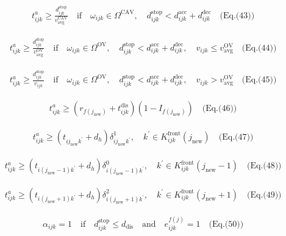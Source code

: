\documentclass[10pt]{article}
\begin{document}
\[\begin{aligned}&\quad t^{a}_{ijk} \geq \frac{d^{\text{stop}}_{ijk}}{v^{\text{CAV}}_{\text{avg}}} \quad \text{if} \quad \omega_{ijk} \in \Omega^{\text{CAV}}, \quad d^{\text{stop}}_{ijk} < d^{\text{acc}}_{ijk} + d^{\text{dec}}_{ijk} \quad \text{(Eq.(43))}\end{aligned}\]

\[\begin{aligned}&\quad t^{a}_{ijk} \geq \frac{d^{\text{stop}}_{ijk}}{v^{\text{OV}}_{\text{avg}}} \quad \text{if} \quad \omega_{ijk} \in \Omega^{\text{OV}}, \quad d^{\text{stop}}_{ijk} < d^{\text{acc}}_{ijk} + d^{\text{dec}}_{ijk}, \quad v_{ijk} \leq v^{\text{OV}}_{\text{avg}} \quad \text{(Eq.(44))}\end{aligned}\]

\[\begin{aligned}&\quad t^{a}_{ijk} \geq \frac{d^{\text{stop}}_{ijk}}{v_{ijk}} \quad \text{if} \quad \omega_{ijk} \in \Omega^{\text{OV}}, \quad d^{\text{stop}}_{ijk} < d^{\text{acc}}_{ijk} + d^{\text{dec}}_{ijk}, \quad v_{ijk} > v^{\text{OV}}_{\text{avg}} \quad \text{(Eq.(45))}\end{aligned}\]

\[\begin{aligned}&\quad t^{a}_{ijk} \geq (r_{f(j_{\text{new}})} + t^{\text{dis}}_{ijk})(1 - I_{f(j_{\text{new}})}) \quad \text{(Eq.(46))}\end{aligned}\]

\[\begin{aligned}&\quad t^{a}_{ijk} \geq (t_{ij_{\text{new}}k^{\prime}} + d_{h})\delta^{1}_{ij_{\text{new}}k^{\prime}}, \quad k^{\prime} \in K^{\text{front}}_{ijk}(j_{\text{new}}) \quad \text{(Eq.(47))}\end{aligned}\]

\[\begin{aligned}&\quad t^{a}_{ijk} \geq (t_{i(j_{\text{new}}-1)k^{\prime}} + d_{h})\delta^{0}_{i(j_{\text{new}}-1)k^{\prime}}, \quad k^{\prime} \in K^{\text{front}}_{ijk}(j_{\text{new}}-1) \quad \text{(Eq.(48))}\end{aligned}\]

\[\begin{aligned}&\quad t^{a}_{ijk} \geq (t_{i(j_{\text{new}}+1)k^{\prime}} + d_{h})\delta^{2}_{i(j_{\text{new}}+1)k^{\prime}}, \quad k^{\prime} \in K^{\text{front}}_{ijk}(j_{\text{new}}+1) \quad \text{(Eq.(49))}\end{aligned}\]

\[\begin{aligned}&\quad \alpha_{ijk} = 1 \quad \text{if} \quad d^{\text{stop}}_{ijk} \leq d_{\text{dis}} \quad \text{and} \quad e^{f(j)}_{ijk} = 1 \quad \text{(Eq.(50))}\end{aligned}\]
\end{document}
